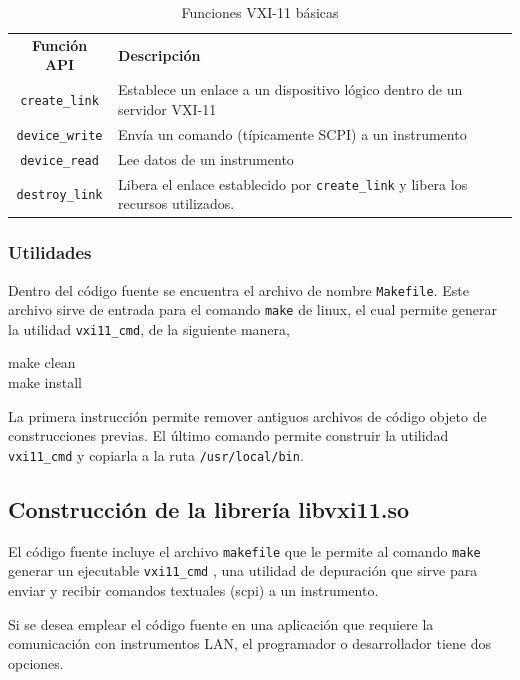 \documentclass[paper=letter,oneside,fontsize=11pt, parskip=full]{scrartcl}
\newenvironment{code}
	{\begin{adjustwidth}{1.0cm}{0.0cm}\ttfamily}
	{\end{adjustwidth}}
\begin{document}
		\begin{table}
			\begin{tabular}{cl}
				\textbf{Función API} 	& \textbf{Descripción} \\
				\texttt{create\_link}	& Establece un enlace a un dispositivo lógico dentro de un servidor VXI-11 \\
				\texttt{device\_write}	& Envía un comando (típicamente SCPI) a un instrumento \\
				\texttt{device\_read}	& Lee datos de un instrumento \\
				\texttt{destroy\_link}	& Libera el enlace establecido por \texttt{create\_link} y libera los recursos utilizados.				
			\end{tabular}
			\caption{Funciones VXI-11 básicas}
			\label{Tab:FuncionesVXI11Basicas}
		\end{table}
	
	\subsubsection{Utilidades}
	
	Dentro del código fuente se encuentra el archivo de nombre \texttt{Makefile}. Este archivo sirve de entrada para el comando \texttt{make} de linux, el cual permite generar la utilidad \texttt{vxi11\_cmd}, de la siguiente manera,
	
	\begin{code}
		make clean \\
		make install		
	\end{code}
	
	La primera instrucción permite remover antiguos archivos de código objeto de construcciones previas. El último comando permite construir la utilidad \texttt{vxi11\_cmd} y copiarla a la ruta \texttt{/usr/local/bin}.	
	
	\subsection{Construcción de la librería libvxi11.so}	
	
	El código fuente incluye el archivo \texttt{makefile} que le permite al comando \texttt{make} generar un ejecutable  \texttt{vxi11\_cmd} , una utilidad de depuración que sirve para enviar y recibir comandos textuales (scpi) a un instrumento.

	Si se desea emplear el código fuente en una aplicación que requiere la comunicación con instrumentos LAN, el programador o 
	desarrollador tiene dos opciones.
	
\end{document}
